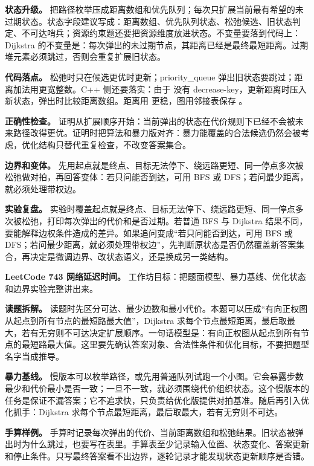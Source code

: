 \textbf{状态升级。} 把路径枚举压成距离数组和优先队列；每次只扩展当前最有希望的未过期状态。状态字段建议写成：距离数组、优先队列状态、松弛候选、旧状态判定、不可达哨兵；资源约束题还要把资源维度放进状态。不变量要落到代码上：Dijkstra 的不变量是：每次弹出的未过期节点，其距离已经是最终最短距离。过期堆元素必须跳过，否则会重复扩展旧状态。

\textbf{代码落点。} 松弛时只在候选更优时更新；priority\_queue 弹出旧状态要跳过；距离加法用更宽整数。C++ 侧还要落实：由于  没有 decrease-key，更新距离时压入新状态，弹出时比较距离数组。距离用  更稳，图用邻接表保存 。

\textbf{正确性检查。} 证明从扩展顺序开始：当前弹出的状态在代价规则下已经不会被未来路径改得更优。证明时把算法和暴力版对齐：暴力能覆盖的合法候选仍然会被考虑，优化结构只替代重复检查，不改变答案集合。

\textbf{边界和变体。} 先用起点就是终点、目标无法停下、绕远路更短、同一停点多次被松弛做对拍，再回答变体：若只问能否到达，可用 BFS 或 DFS；若问最少距离，就必须处理带权边。

\textbf{实验复盘。} 实验时覆盖起点就是终点、目标无法停下、绕远路更短、同一停点多次被松弛，打印每次弹出的代价和是否过期。若普通 BFS 与 Dijkstra 结果不同，要能解释边权条件造成的差异。如果追问变成“若只问能否到达，可用 BFS 或 DFS；若问最少距离，就必须处理带权边”，先判断原状态是否仍然覆盖新答案集合，再决定是微调边界、改状态语义，还是换成另一类结构。

\noindent\textbf{LeetCode 743 网络延迟时间。} 工作坊目标：把题面模型、暴力基线、优化状态和边界实验完整讲出来。

\textbf{读题拆解。} 读题时先区分可达、最少边数和最小代价。本题可以压成“有向正权图从起点到所有节点的最短路最大值”，Dijkstra 求每个节点最短距离，最后取最大，若有无穷则不可达决定扩展顺序。一句话模型是：有向正权图从起点到所有节点的最短路最大值。这里要先确认答案对象、合法性条件和优化目标，不要把题型名字当成推导。

\textbf{暴力基线。} 慢版本可以枚举路径，或先用普通队列试跑一个小图。它会暴露步数最少和代价最小是否一致；一旦不一致，就必须围绕代价组织状态。这个慢版本的任务是保证不漏答案；它不追求快，只负责给优化版提供对拍基准。随后再引入优化抓手：Dijkstra 求每个节点最短距离，最后取最大，若有无穷则不可达。

\textbf{手算样例。} 手算时记录每次弹出的代价、当前距离数组和松弛结果。旧状态被弹出时为什么跳过，也要写在表里。手算表至少记录输入位置、状态变化、答案更新和停止条件。只写最终答案看不出边界，逐轮记录才能发现状态更新顺序是否错。

